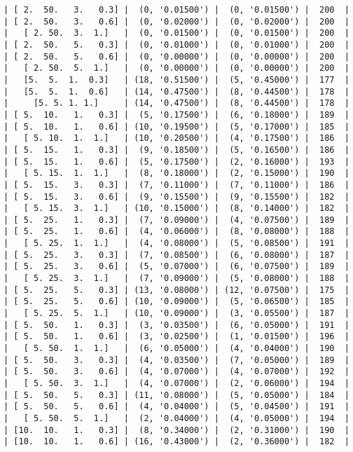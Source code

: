 \documentclass{article}
\begin{document}
\begin{verbatim}
| [ 2.  50.   3.   0.3] |  (0, '0.01500') |  (0, '0.01500') |  200  |
| [ 2.  50.   3.   0.6] |  (0, '0.02000') |  (0, '0.02000') |  200  |
|   [ 2. 50.  3.  1.]   |  (0, '0.01500') |  (0, '0.01500') |  200  |
| [ 2.  50.   5.   0.3] |  (0, '0.01000') |  (0, '0.01000') |  200  |
| [ 2.  50.   5.   0.6] |  (0, '0.00000') |  (0, '0.00000') |  200  |
|   [ 2. 50.  5.  1.]   |  (0, '0.00000') |  (0, '0.00000') |  200  |
|   [5.  5.  1.  0.3]   | (18, '0.51500') |  (5, '0.45000') |  177  |
|   [5.  5.  1.  0.6]   | (14, '0.47500') |  (8, '0.44500') |  178  |
|     [5. 5. 1. 1.]     | (14, '0.47500') |  (8, '0.44500') |  178  |
| [ 5.  10.   1.   0.3] |  (5, '0.17500') |  (6, '0.18000') |  189  |
| [ 5.  10.   1.   0.6] | (10, '0.19500') |  (5, '0.17000') |  185  |
|   [ 5. 10.  1.  1.]   | (10, '0.20500') |  (4, '0.17500') |  186  |
| [ 5.  15.   1.   0.3] |  (9, '0.18500') |  (5, '0.16500') |  186  |
| [ 5.  15.   1.   0.6] |  (5, '0.17500') |  (2, '0.16000') |  193  |
|   [ 5. 15.  1.  1.]   |  (8, '0.18000') |  (2, '0.15000') |  190  |
| [ 5.  15.   3.   0.3] |  (7, '0.11000') |  (7, '0.11000') |  186  |
| [ 5.  15.   3.   0.6] |  (9, '0.15500') |  (9, '0.15500') |  182  |
|   [ 5. 15.  3.  1.]   | (10, '0.15000') |  (8, '0.14000') |  182  |
| [ 5.  25.   1.   0.3] |  (7, '0.09000') |  (4, '0.07500') |  189  |
| [ 5.  25.   1.   0.6] |  (4, '0.06000') |  (8, '0.08000') |  188  |
|   [ 5. 25.  1.  1.]   |  (4, '0.08000') |  (5, '0.08500') |  191  |
| [ 5.  25.   3.   0.3] |  (7, '0.08500') |  (6, '0.08000') |  187  |
| [ 5.  25.   3.   0.6] |  (5, '0.07000') |  (6, '0.07500') |  189  |
|   [ 5. 25.  3.  1.]   |  (7, '0.09000') |  (5, '0.08000') |  188  |
| [ 5.  25.   5.   0.3] | (13, '0.08000') | (12, '0.07500') |  175  |
| [ 5.  25.   5.   0.6] | (10, '0.09000') |  (5, '0.06500') |  185  |
|   [ 5. 25.  5.  1.]   | (10, '0.09000') |  (3, '0.05500') |  187  |
| [ 5.  50.   1.   0.3] |  (3, '0.03500') |  (6, '0.05000') |  191  |
| [ 5.  50.   1.   0.6] |  (3, '0.02500') |  (1, '0.01500') |  196  |
|   [ 5. 50.  1.  1.]   |  (6, '0.05000') |  (4, '0.04000') |  190  |
| [ 5.  50.   3.   0.3] |  (4, '0.03500') |  (7, '0.05000') |  189  |
| [ 5.  50.   3.   0.6] |  (4, '0.07000') |  (4, '0.07000') |  192  |
|   [ 5. 50.  3.  1.]   |  (4, '0.07000') |  (2, '0.06000') |  194  |
| [ 5.  50.   5.   0.3] | (11, '0.08000') |  (5, '0.05000') |  184  |
| [ 5.  50.   5.   0.6] |  (4, '0.04000') |  (5, '0.04500') |  191  |
|   [ 5. 50.  5.  1.]   |  (2, '0.04000') |  (4, '0.05000') |  194  |
| [10.  10.   1.   0.3] |  (8, '0.34000') |  (2, '0.31000') |  190  |
| [10.  10.   1.   0.6] | (16, '0.43000') |  (2, '0.36000') |  182  |

\end{verbatim}
\end{document}
